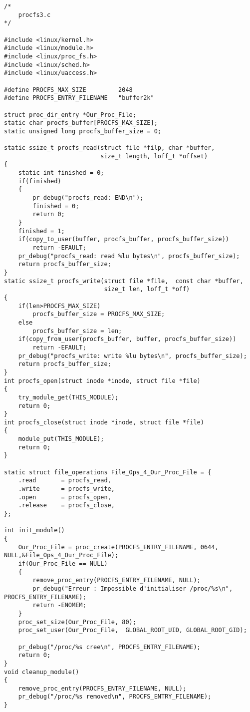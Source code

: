 \documentclass[11pt]{article}
\begin{document}
\begin{verbatim}
/*
    procfs3.c
*/

#include <linux/kernel.h>
#include <linux/module.h>
#include <linux/proc_fs.h>
#include <linux/sched.h>
#include <linux/uaccess.h>

#define PROCFS_MAX_SIZE         2048
#define PROCFS_ENTRY_FILENAME   "buffer2k"

struct proc_dir_entry *Our_Proc_File;
static char procfs_buffer[PROCFS_MAX_SIZE];
static unsigned long procfs_buffer_size = 0;

static ssize_t procfs_read(struct file *filp, char *buffer,
                           size_t length, loff_t *offset)
{
    static int finished = 0;
    if(finished)
    {
        pr_debug("procfs_read: END\n");
        finished = 0;
        return 0;
    }
    finished = 1;
    if(copy_to_user(buffer, procfs_buffer, procfs_buffer_size))
        return -EFAULT;
    pr_debug("procfs_read: read %lu bytes\n", procfs_buffer_size);
    return procfs_buffer_size;
}
static ssize_t procfs_write(struct file *file,  const char *buffer,
                            size_t len, loff_t *off)
{
    if(len>PROCFS_MAX_SIZE)
        procfs_buffer_size = PROCFS_MAX_SIZE;
    else
        procfs_buffer_size = len;
    if(copy_from_user(procfs_buffer, buffer, procfs_buffer_size))
        return -EFAULT;
    pr_debug("procfs_write: write %lu bytes\n", procfs_buffer_size);
    return procfs_buffer_size;
}
int procfs_open(struct inode *inode, struct file *file)
{
    try_module_get(THIS_MODULE);
    return 0;
}
int procfs_close(struct inode *inode, struct file *file)
{
    module_put(THIS_MODULE);
    return 0;
}

static struct file_operations File_Ops_4_Our_Proc_File = {
    .read       = procfs_read,
    .write      = procfs_write,
    .open       = procfs_open,
    .release    = procfs_close,
};

int init_module()
{
    Our_Proc_File = proc_create(PROCFS_ENTRY_FILENAME, 0644, NULL,&File_Ops_4_Our_Proc_File);
    if(Our_Proc_File == NULL)
    {
        remove_proc_entry(PROCFS_ENTRY_FILENAME, NULL);
        pr_debug("Erreur : Impossible d'initialiser /proc/%s\n", PROCFS_ENTRY_FILENAME);
        return -ENOMEM;
    }
    proc_set_size(Our_Proc_File, 80);
    proc_set_user(Our_Proc_File,  GLOBAL_ROOT_UID, GLOBAL_ROOT_GID);

    pr_debug("/proc/%s cree\n", PROCFS_ENTRY_FILENAME);
    return 0;
}
void cleanup_module()
{
    remove_proc_entry(PROCFS_ENTRY_FILENAME, NULL);
    pr_debug("/proc/%s removed\n", PROCFS_ENTRY_FILENAME);
}
\end{verbatim}
\end{document}
